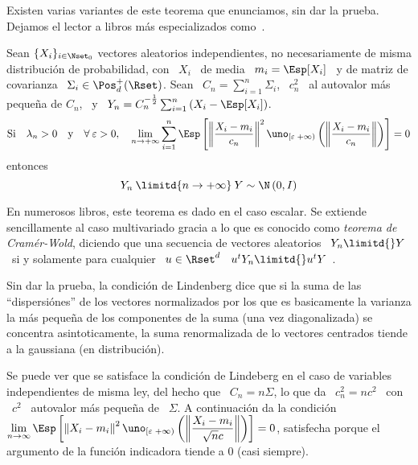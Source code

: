 Existen  varias   variantes  de  este   teorema  que  enunciamos,  sin   dar  la
prueba.  Dejamos el  lector a  libros m\'as  especializados como~\cite{AshDol99,
  Bil12, AthLah06, Lin22}.

\begin{teorema}\label{Teo:MP:LindenbergFeller}
%
  Sean  $\{  X_i \}_{i  \in  \Nset_0}$  vectores  aleatorios independientes,  no
  necesariamente de misma distribuci\'on de probabilidad, con \ $X_i$ \ de media
  \ $m_i = \Esp[X_i]$ \ y de matriz de covarianza \ $\Sigma_i \in \Pos_d^+(\Rset)$.
  Sean \ $C_n = \sum_{i=1}^n \Sigma_i$, \ $c_n^2$ \ al autovalor m\'as peque\~na
  de $C_n$,  \ y  \ $Y_n  = C_n^{-\frac12} \sum_{i=1}^n  \left( X_i  - \Esp[X_i]
  \right)$.
  \[
  \mbox{Si} \quad \lambda_n > 0 \quad \mbox{y} \quad \forall \: \varepsilon > 0,
  \quad  \lim_{n  \to  +\infty}  \sum_{i=1}^n  \Esp\left[  \left\|  \frac{X_i  -
        m_i}{c_n} \right\|^2  \uno_{\left[ \varepsilon \;  +\infty \right)}\left(
      \left\| \frac{X_i - m_i}{c_n} \right\| \right) \right] = 0
  \]
  entonces
  \[
  Y_n \: \limitd{n \to +\infty} \: Y \sim \N\left( 0 , I \right)
  \]
\end{teorema}
%
En  numerosos libros,  este teorema  es  dado en  el caso  escalar. Se  extiende
sencillamente al caso multivariado gracia a lo que es conocido como {\it teorema
  de Cram\'er-Wold},  diciendo que una  secuencia de vectores aleatorios  \ $Y_n
\limitd{}  Y$ \  si y  solamente para  cualquier \  $u \in  \Rset^d$ \  $u^t Y_n
\limitd{} u^t Y$~\cite{AshDol99, AthLah06, Bil12}.

Sin dar  la prueba,  la condici\'on  de Lindenberg dice  que si  la suma  de las
``dispersi\'ones'' de  los vectores normalizados  por los que es  basicamente la
varianza  la   m\'as  peque\~na  de  los   componentes  de  la   suma  (una  vez
diagonalizada)  se  concentra  asintoticamente,  la  suma  renormalizada  de  lo
vectores centrados tiende a la gaussiana (en distribuci\'on).

Se  puede ver  que  se  satisface la  condici\'on  de Lindeberg  en  el caso  de
variables independientes de misma ley, del hecho  que \ $C_n = n \Sigma$, lo que
da \ $c_n^2 = n c^2$ \ con  \ $c^2$ \ autovalor m\'as peque\~na de \ $\Sigma$. A
continuaci\'on da la condici\'on \ $\displaystyle \lim_{n \to \infty} \Esp\left[
  \left\| X_i - m_i \right\|^2 \uno_{\left[ \varepsilon \; +\infty \right)}\left(
    \left\|  \frac{X_i  -  m_i}{\sqrt{n}  c}  \right\|  \right)  \right]  =  0$,
satisfecha  porque el  argumento de  la funci\'on  indicadora tiende  a  0 (casi
siempre).

